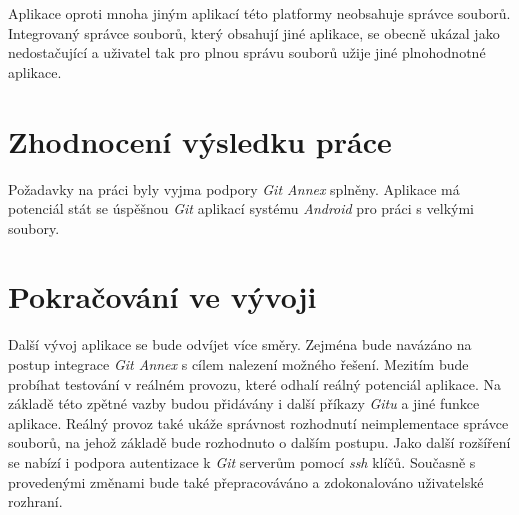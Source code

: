 Aplikace oproti mnoha jiným aplikací této platformy neobsahuje správce souborů. Integrovaný správce souborů, který obsahují jiné aplikace, se obecně ukázal jako nedostačující a uživatel tak pro plnou správu souborů užije jiné plnohodnotné aplikace.

\section{Zhodnocení výsledku práce}
Požadavky na práci byly vyjma podpory \emph{Git Annex} splněny. Aplikace má potenciál stát se úspěšnou \emph{Git} aplikací systému \emph{Android} pro práci s velkými soubory.

\section{Pokračování ve vývoji}
Další vývoj aplikace se bude odvíjet více směry. Zejména bude navázáno na postup integrace \emph{Git Annex} s cílem nalezení možného řešení. Mezitím bude probíhat testování v reálném provozu, které odhalí reálný potenciál aplikace. Na základě této zpětné vazby budou přidávány i další příkazy \emph{Gitu} a jiné funkce aplikace. Reálný provoz také ukáže správnost rozhodnutí neimplementace správce souborů, na jehož základě bude rozhodnuto o dalším postupu. Jako další rozšíření se nabízí i podpora autentizace k \emph{Git} serverům pomocí \emph{ssh} klíčů. Současně s provedenými změnami bude také přepracováváno a zdokonalováno uživatelské rozhraní.
